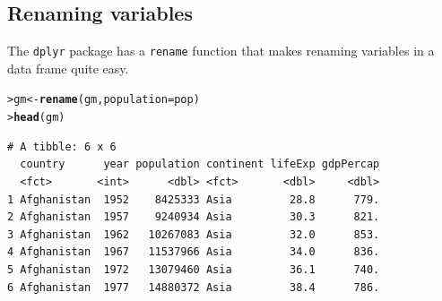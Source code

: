 \documentclass[12pt,oneside]{book}\usepackage[]{graphicx}\usepackage[]{color}
\makeatletter
\newcommand{\hlstd}[1]{\textcolor[rgb]{0.345,0.345,0.345}{#1}}%
\newcommand{\hlkwb}[1]{\textcolor[rgb]{0.69,0.353,0.396}{#1}}%
\newcommand{\hlkwc}[1]{\textcolor[rgb]{0.333,0.667,0.333}{#1}}%
\newcommand{\hlkwd}[1]{\textcolor[rgb]{0.737,0.353,0.396}{\textbf{#1}}}%
\newenvironment{kframe}{%
 \def\at@end@of@kframe{}%
 \ifinner\ifhmode%
  \def\at@end@of@kframe{\end{minipage}}%
  \begin{minipage}{\columnwidth}%
 \fi\fi%
 \def\FrameCommand##1{\hskip\@totalleftmargin \hskip-\fboxsep
 \colorbox{shadecolor}{##1}\hskip-\fboxsep
     \hskip-\linewidth \hskip-\@totalleftmargin \hskip\columnwidth}%
 \MakeFramed {\advance\hsize-\width
   \@totalleftmargin\z@ \linewidth\hsize
   \@setminipage}}%
 {\par\unskip\endMakeFramed%
 \at@end@of@kframe}
\newenvironment{knitrout}{}{} %
\makeatother
\begin{document}
\subsection{Renaming variables}
The \verb+dplyr+ package has a \verb+rename+ function that makes renaming variables in a data frame quite easy.
\begin{knitrout}
\color{fgcolor}\begin{kframe}
\begin{alltt}
\hlstd{> }\hlstd{gm} \hlkwb{<-} \hlkwd{rename}\hlstd{(gm,} \hlkwc{population} \hlstd{= pop)}
\hlstd{> }\hlkwd{head}\hlstd{(gm)}
\end{alltt}
\begin{verbatim}
# A tibble: 6 x 6
  country      year population continent lifeExp gdpPercap
  <fct>       <int>      <dbl> <fct>       <dbl>     <dbl>
1 Afghanistan  1952    8425333 Asia         28.8      779.
2 Afghanistan  1957    9240934 Asia         30.3      821.
3 Afghanistan  1962   10267083 Asia         32.0      853.
4 Afghanistan  1967   11537966 Asia         34.0      836.
5 Afghanistan  1972   13079460 Asia         36.1      740.
6 Afghanistan  1977   14880372 Asia         38.4      786.
\end{verbatim}
\end{kframe}
\end{knitrout}
\end{document}
